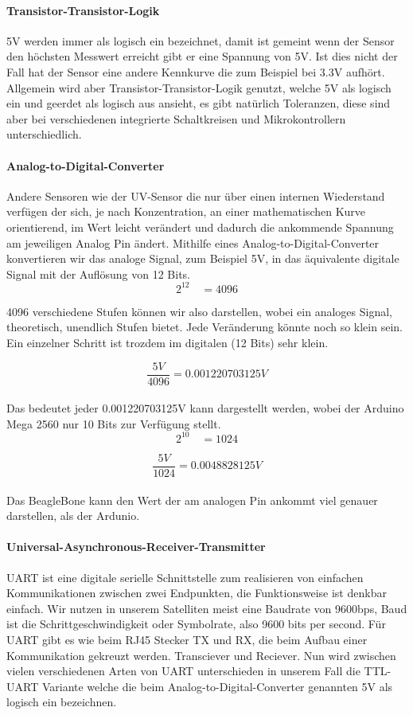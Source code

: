 \paragraph{Transistor-Transistor-Logik}
5V werden immer als logisch ein bezeichnet, damit ist gemeint wenn der Sensor den höchsten Messwert erreicht gibt er eine Spannung von 5V. Ist dies nicht der Fall hat der Sensor eine andere Kennkurve die zum Beispiel bei 3.3V aufhört. Allgemein wird aber Transistor-Transistor-Logik genutzt, welche 5V als logisch ein und geerdet als logisch aus ansieht, es gibt natürlich Toleranzen, diese sind aber bei verschiedenen integrierte Schaltkreisen und Mikrokontrollern unterschiedlich.

\paragraph{Analog-to-Digital-Converter}
Andere Sensoren wie der UV-Sensor die nur über einen internen Wiederstand verfügen der sich, je nach Konzentration, an einer mathematischen Kurve orientierend, im Wert leicht verändert und dadurch die ankommende Spannung am jeweiligen Analog Pin ändert. Mithilfe eines Analog-to-Digital-Converter konvertieren wir das analoge Signal, zum Beispiel 5V, in das äquivalente digitale Signal mit der Auflösung von 12 Bits. \\

\[
2^{12} \quad = 4096
\]

4096 verschiedene Stufen können wir also darstellen, wobei ein analoges Signal, theoretisch, unendlich Stufen bietet. Jede Veränderung könnte noch so klein sein. Ein einzelner Schritt ist trozdem im digitalen (12 Bits) sehr klein.

\[
\frac{5V}{4096} = 0.001220703125 V
\] \\

Das bedeutet jeder 0.001220703125V kann dargestellt werden, wobei der Arduino Mega 2560 nur 10 Bits zur Verfügung stellt. \\

\[
2^{10} \quad = 1024
\]

\[
\frac{5V}{1024} = 0.0048828125V
\] \\

Das BeagleBone kann den Wert der am analogen Pin ankommt viel genauer darstellen, als der Ardunio. 

\paragraph{Universal-Asynchronous-Receiver-Transmitter}
UART ist eine digitale serielle Schnittstelle zum realisieren von einfachen Kommunikationen zwischen zwei Endpunkten, die Funktionsweise ist denkbar einfach. Wir nutzen in unserem Satelliten meist eine Baudrate von 9600bps, Baud ist die Schrittgeschwindigkeit oder Symbolrate, also 9600 bits per second. Für UART gibt es wie beim RJ45 Stecker TX und RX, die beim Aufbau einer Kommunikation gekreuzt werden. Transciever und Reciever. Nun wird zwischen vielen verschiedenen Arten von UART unterschieden in unserem Fall die TTL-UART Variante welche die beim Analog-to-Digital-Converter genannten 5V als logisch ein bezeichnen. \\

